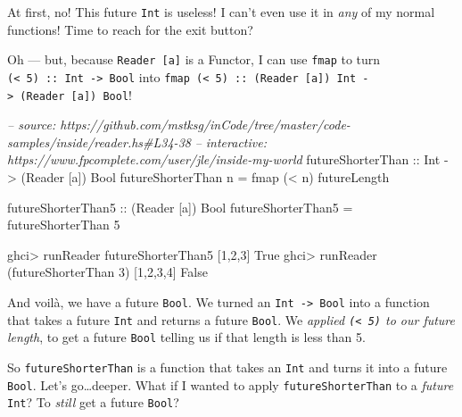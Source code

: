 \documentclass[]{article}
\newenvironment{Shaded}{\begin{snugshade}}{\end{snugshade}}
\newcommand{\CommentTok}[1]{\textcolor[rgb]{0.56,0.35,0.01}{\textit{#1}}}
\newcommand{\DataTypeTok}[1]{\textcolor[rgb]{0.13,0.29,0.53}{#1}}
\newcommand{\DecValTok}[1]{\textcolor[rgb]{0.00,0.00,0.81}{#1}}
\newcommand{\FunctionTok}[1]{\textcolor[rgb]{0.00,0.00,0.00}{#1}}
\newcommand{\NormalTok}[1]{#1}
\newcommand{\OtherTok}[1]{\textcolor[rgb]{0.56,0.35,0.01}{#1}}
\begin{document}
At first, no! This future \texttt{Int} is useless! I can't even use it in
\emph{any} of my normal functions! Time to reach for the exit button?

Oh --- but, because \texttt{Reader\ {[}a{]}} is a Functor, I can use
\texttt{fmap} to turn \texttt{(\textless{}\ 5)\ ::\ Int\ -\textgreater{}\ Bool}
into
\texttt{fmap\ (\textless{}\ 5)\ ::\ (Reader\ {[}a{]})\ Int\ -\textgreater{}\ (Reader\ {[}a{]})\ Bool}!

\begin{Shaded}
\begin{Highlighting}[]
\CommentTok{-- source: https://github.com/mstksg/inCode/tree/master/code-samples/inside/reader.hs#L34-38}
\CommentTok{-- interactive: https://www.fpcomplete.com/user/jle/inside-my-world}
\OtherTok{futureShorterThan ::} \DataTypeTok{Int} \OtherTok{->}\NormalTok{ (}\DataTypeTok{Reader}\NormalTok{ [a]) }\DataTypeTok{Bool}
\NormalTok{futureShorterThan n }\FunctionTok{=}\NormalTok{ fmap (}\FunctionTok{<}\NormalTok{ n) futureLength}

\OtherTok{futureShorterThan5 ::}\NormalTok{ (}\DataTypeTok{Reader}\NormalTok{ [a]) }\DataTypeTok{Bool}
\NormalTok{futureShorterThan5 }\FunctionTok{=}\NormalTok{ futureShorterThan }\DecValTok{5}
\end{Highlighting}
\end{Shaded}

\begin{Shaded}
\begin{Highlighting}[]
\NormalTok{ghci}\FunctionTok{>}\NormalTok{ runReader futureShorterThan5 [}\DecValTok{1}\NormalTok{,}\DecValTok{2}\NormalTok{,}\DecValTok{3}\NormalTok{]}
\DataTypeTok{True}
\NormalTok{ghci}\FunctionTok{>}\NormalTok{ runReader (futureShorterThan }\DecValTok{3}\NormalTok{) [}\DecValTok{1}\NormalTok{,}\DecValTok{2}\NormalTok{,}\DecValTok{3}\NormalTok{,}\DecValTok{4}\NormalTok{]}
\DataTypeTok{False}
\end{Highlighting}
\end{Shaded}

And voilà, we have a future \texttt{Bool}. We turned an
\texttt{Int\ -\textgreater{}\ Bool} into a function that takes a future
\texttt{Int} and returns a future \texttt{Bool}. We \emph{applied
\texttt{(\textless{}\ 5)} to our future length}, to get a future \texttt{Bool}
telling us if that length is less than 5.

So \texttt{futureShorterThan} is a function that takes an \texttt{Int} and turns
it into a future \texttt{Bool}. Let's go\ldots{}deeper. What if I wanted to
apply \texttt{futureShorterThan} to a \emph{future} \texttt{Int}? To
\emph{still} get a future \texttt{Bool}?
\end{document}
